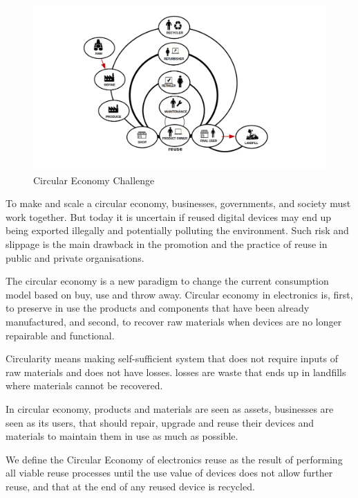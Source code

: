 \documentclass[
]{book}
\begin{document}
\begin{figure}

{\centering \includegraphics[width=1\linewidth]{./figs/26} 

}

\caption{Circular Economy Challenge}\label{fig:figcirculareconomy}
\end{figure}

To make and scale a circular economy, businesses, governments, and society must work together. But today it is uncertain if reused digital devices may end up being exported illegally and potentially polluting the environment. Such risk and slippage is the main drawback in the promotion and the practice of reuse in public and private organisations.

The circular economy is a new paradigm to change the current consumption model based on buy, use and throw away. Circular economy in electronics is, first, to preserve in use the products and components that have been already manufactured, and second, to recover raw materials when devices are no longer repairable and functional.

Circularity means making self-sufficient system that does not require inputs of raw materials and does not have losses. losses are waste that ends up in landfills where materials cannot be recovered.

In circular economy, products and materials are seen as assets, businesses are seen as its users, that should repair, upgrade and reuse their devices and materials to maintain them in use as much as possible.

We define the Circular Economy of electronics reuse as the result of performing all viable reuse processes until the use value of devices does not allow further reuse, and that at the end of any reused device is recycled.
\end{document}
